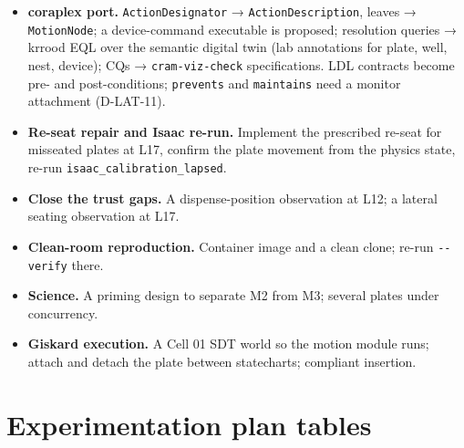 \documentclass[10pt,a4paper]{article}
\begin{document}
\begin{itemize}
  \item \textbf{coraplex port.} \texttt{ActionDesignator} → \texttt{ActionDescription}, leaves → \texttt{MotionNode}; a device-command executable is proposed; resolution queries → krrood EQL over the semantic digital twin (lab annotations for plate, well, nest, device); CQs → \texttt{cram-\allowbreak{}viz-\allowbreak{}check} specifications. LDL contracts become pre- and post-conditions; \texttt{prevents} and \texttt{maintains} need a monitor attachment (D-LAT-11).
  \item \textbf{Re-seat repair and Isaac re-run.} Implement the prescribed re-seat for misseated plates at L17, confirm the plate movement from the physics state, re-run \texttt{isaac\_\allowbreak{}calibration\_\allowbreak{}lapsed}.
  \item \textbf{Close the trust gaps.} A dispense-position observation at L12; a lateral seating observation at L17.
  \item \textbf{Clean-room reproduction.} Container image and a clean clone; re-run \texttt{-\allowbreak{}-\allowbreak{}verify} there.
  \item \textbf{Science.} A priming design to separate M2 from M3; several plates under concurrency.
  \item \textbf{Giskard execution.} A Cell 01 SDT world so the motion module runs; attach and detach the plate between statecharts; compliant insertion.
\end{itemize}

\FloatBarrier


\appendix

\section{Experimentation plan tables}\label{sec:appendix-plan}
\end{document}
